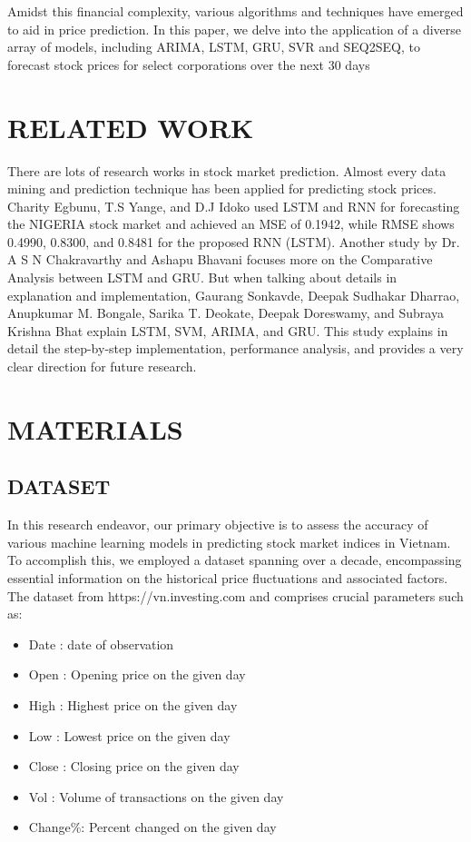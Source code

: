 \documentclass{ieeeojies}
\begin{document}
Amidst this financial complexity, various algorithms and techniques have emerged to aid in price prediction. In this paper, we delve into the application of a diverse array of models, including ARIMA, LSTM, GRU, SVR and SEQ2SEQ, to forecast stock prices for select corporations over the next 30 days

\section{RELATED WORK}
There are lots of research works in stock market prediction. Almost every data mining and prediction technique has been applied for predicting stock prices. Charity Egbunu, T.S Yange, and D.J Idoko used LSTM and RNN for forecasting the NIGERIA stock market and achieved an MSE of 0.1942, while RMSE shows 0.4990, 0.8300, and 0.8481 for the proposed RNN (LSTM)\cite{a7}. Another study by Dr. A S N Chakravarthy and Ashapu Bhavani focuses more on the Comparative Analysis between LSTM and GRU\cite{a6}. But when talking about details in explanation and implementation, Gaurang Sonkavde, Deepak Sudhakar Dharrao, Anupkumar M. Bongale, Sarika T. Deokate, Deepak Doreswamy, and Subraya Krishna Bhat explain LSTM, SVM, ARIMA, and GRU. This study explains in detail the step-by-step implementation, performance analysis, and provides a very clear direction for future research\cite{a5}.

\section{MATERIALS}
\subsection{DATASET}
In this research endeavor, our primary objective is to assess the accuracy of various machine learning models in predicting stock market indices in Vietnam. To accomplish this, we employed a dataset spanning over a decade, encompassing essential information on the historical price fluctuations and associated factors. The dataset from https://vn.investing.com and comprises crucial parameters such as:

\begin{itemize}
    \item Date : date of observation 
    \item Open : Opening price on the given day 
    \item High : Highest price on the given day
    \item Low : Lowest price on the given day 
    \item Close : Closing price on the given day 
    \item Vol : Volume of transactions on the given day
    \item Change\%: Percent changed on the given day
\end{itemize}
\end{document}
